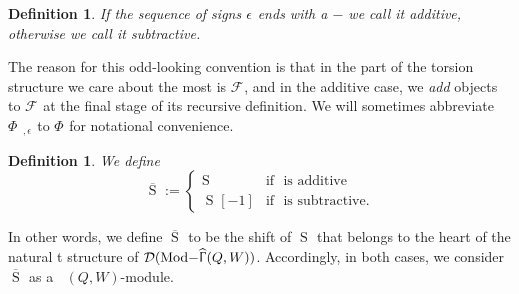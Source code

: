 \documentclass[a4paper,10pt]{amsart}
\newtheorem{definition}[theorem]{Definition}
\DeclareMathOperator{\Simp}{S}
\newcommand{\shave}{\overline{\Simp}_{\Ss}}
\renewcommand{\Gamma}{\Upgamma}
\DeclareMathOperator{\Tmod}{Mod-}
\newcommand{\Rmod}[1]{\Tmod\!#1}
\DeclareMathOperator{\HJac}{\widehat{Jac}}
\DeclareMathOperator{\HGamma}{\widehat{\Gamma}}
\DeclareMathOperator{\Ss}{\overline{s}}
\newcommand{\Dub}{\mathcal{D}}
\begin{document}
\begin{definition}
If the sequence of signs $\epsilon_{\Ss}$ ends with a $-$ we call it \textit{additive}, otherwise we call it \textit{subtractive}.  
\end{definition}
The reason for this odd-looking convention is that in the part of the torsion structure we care about the most is $\mathcal{F}_{\Ss}$, and in the additive case, we \textit{add} objects to $\mathcal{F}_{\Ss}$ at the final stage of its recursive definition.  We will sometimes abbreviate $\Phi_{\Ss,\epsilon_{\Ss}}$ to $\Phi_{\Ss}$ for notational convenience.  
\begin{definition}\label{shaveDef}
We define 
\[
\shave:=\begin{cases} \Simp_{\Ss}&\textrm{if }\Ss\textrm{ is additive}\\ \Simp_{\Ss}[-1]&\textrm{if }\Ss\textrm{ is subtractive.}\end{cases}
\]
\end{definition}
In other words, we define $\shave$ to be the shift of $\Simp_{\Ss}$ that belongs to the heart of the natural t structure of $\Dub(\Rmod{\HGamma(Q,W)})$.  Accordingly, in both cases, we consider $\shave$ as a $\HJac(Q,W)$-module.  
\end{document}
